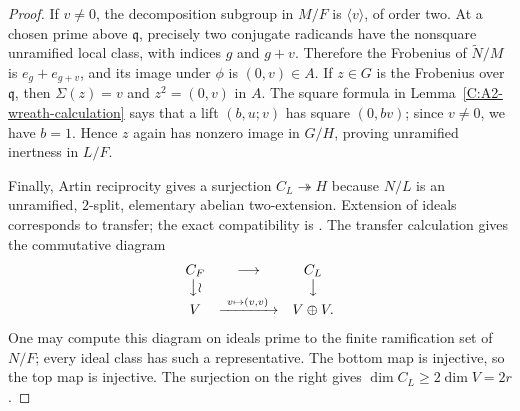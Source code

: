 \begin{proof}
If $v\ne0$, the decomposition subgroup in $M/F$ is
$\langle v\rangle$, of order two. At a chosen prime above
$\mathfrak q$, precisely two conjugate radicands have the
nonsquare unramified local class, with indices $g$ and $g+v$.
Therefore the Frobenius of $\widetilde N/M$ is $e_g+e_{g+v}$,
and its image under $\phi$ is $(0,v)\in A$.
If $z\in G$ is the Frobenius over $\mathfrak q$, then
$\Sigma(z)=v$ and $z^2=(0,v)$ in $A$. The square formula in
Lemma~\ref{C:A2-wreath-calculation} says that a lift $(b,u;v)$
has square $(0,bv)$; since $v\ne0$, we have $b=1$.
Hence $z$ again has nonzero image in $G/H$, proving unramified
inertness in $L/F$.

Finally, Artin reciprocity gives a surjection
$C_L\twoheadrightarrow H$ because $N/L$ is an unramified,
$2$-split, elementary abelian two-extension. Extension of ideals
corresponds to transfer; the exact compatibility is
\cite[Chapter V, Proposition 3.18 and the paragraph following it,
p.~162]{C_MilneCFT2020}. The transfer calculation gives the
commutative diagram
\[
 \begin{array}{ccc}
 C_F&\longrightarrow&C_L\\
 \big\downarrow\wr&&\big\downarrow\\
 V&\xrightarrow{\ v\mapsto(v,v)\ }&V\oplus V.
 \end{array}
\]
One may compute this diagram on ideals prime to the finite
ramification set of $N/F$; every ideal class has such a representative.
The bottom map is injective, so the top map is injective. The
surjection on the right gives $\dim C_L\ge2\dim V=2r$.
\end{proof}


